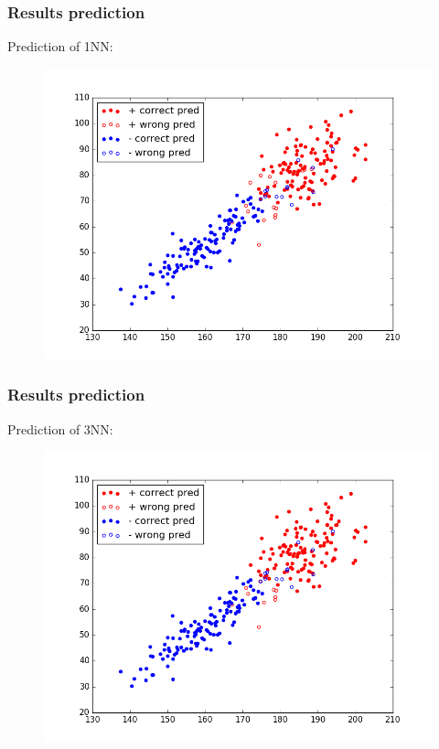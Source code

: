 \documentclass{beamer}
\begin{document}
\begin{frame}
\frametitle{Results prediction}
Prediction of 1NN:
\begin{figure}
	\includegraphics[height=0.8\textheight]{graphics/1NNPrediction}
\end{figure}
\end{frame} 

\begin{frame}
\frametitle{Results prediction}
Prediction of 3NN:
\begin{figure}
	\includegraphics[height=0.8\textheight]{graphics/3NNPrediction}
\end{figure}
\end{frame} 
\end{document}
